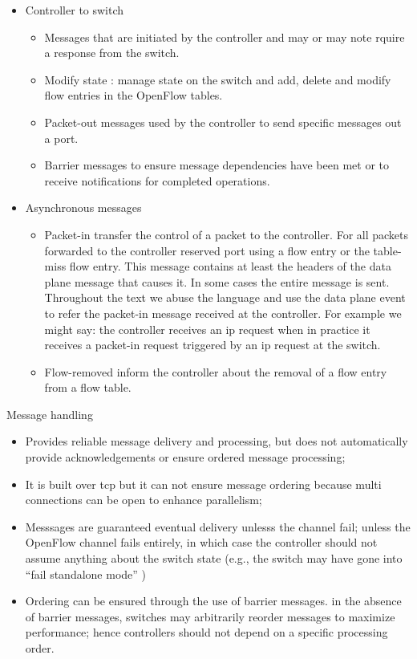 \documentclass[12pt,openright,twoside]{report}
\begin{document}
\begin{itemize}
\begin{itemize}
\item Controller to switch
  \begin{itemize}
  \item Messages that are initiated by the controller and may or may note rquire a response from the switch. 
\item Modify state : manage state on the switch and add, delete and modify flow entries in  the OpenFlow tables. 
  \item Packet-out messages used by the controller to send specific messages out a port. 
  \item Barrier messages to ensure message dependencies have been met or to receive notifications for completed operations. 
  \end{itemize}
\item Asynchronous messages 
  \begin{itemize}
  \item Packet-in transfer the control of a packet to the controller. For all packets forwarded to the controller reserved port using a flow entry or the table-miss flow entry. This message contains at least the headers of the data plane message that causes it. In some cases the entire message is sent. Throughout the text we abuse the language and use  the data plane event to refer the packet-in message received at the controller. For example we might say: the controller receives an \gls{ip} request when in practice it receives a packet-in request triggered by an \gls{ip} request at the switch. 
  \item Flow-removed inform the controller about the removal of a flow entry from a flow table. 
  \end{itemize}

\end{itemize}


Message handling
\begin{itemize}
\item Provides reliable message delivery and processing, but does not automatically provide acknowledgements or ensure ordered message processing;
\item It is built over \gls{tcp} but it can not ensure message ordering because multi connections can be open to enhance parallelism; 
\item Messsages are guaranteed eventual delivery unlesss the channel fail; unless the OpenFlow channel fails entirely, in which case the controller should not assume anything about the switch state (e.g., the switch may have gone into ``fail standalone mode'' ) 
\item Ordering can be ensured through the use of barrier messages. in the absence of barrier messages, switches may arbitrarily reorder messages to maximize performance; hence controllers should not depend on a specific processing order. 
\end{itemize}


\end{itemize}
\end{document}
